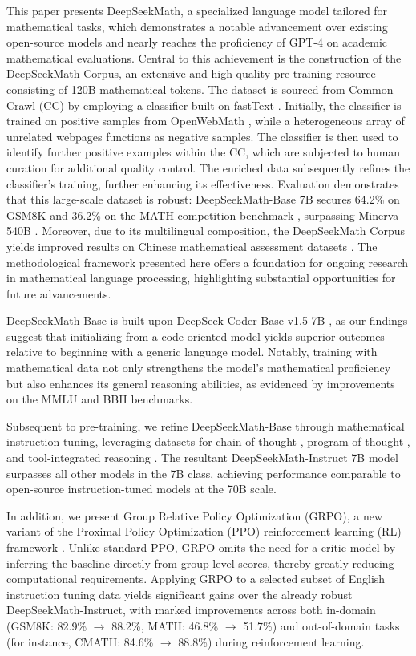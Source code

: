 This paper presents DeepSeekMath, a specialized language model tailored for mathematical tasks, which demonstrates a notable advancement over existing open-source models and nearly reaches the proficiency of GPT-4 on academic mathematical evaluations. Central to this achievement is the construction of the DeepSeekMath Corpus, an extensive and high-quality pre-training resource consisting of 120B mathematical tokens. The dataset is sourced from Common Crawl (CC) by employing a classifier built on fastText \citep{joulin2016fasttext}. Initially, the classifier is trained on positive samples from OpenWebMath \citep{openwebmath}, while a heterogeneous array of unrelated webpages functions as negative samples. The classifier is then used to identify further positive examples within the CC, which are subjected to human curation for additional quality control. The enriched data subsequently refines the classifier’s training, further enhancing its effectiveness. Evaluation demonstrates that this large-scale dataset is robust: DeepSeekMath-Base 7B secures 64.2\% on GSM8K \citep{gsm8k} and 36.2\% on the MATH competition benchmark \citep{MATH}, surpassing Minerva 540B \citep{minerva}. Moreover, due to its multilingual composition, the DeepSeekMath Corpus yields improved results on Chinese mathematical assessment datasets \citep{wei2023cmath,agieval}. The methodological framework presented here offers a foundation for ongoing research in mathematical language processing, highlighting substantial opportunities for future advancements.

DeepSeekMath-Base is built upon DeepSeek-Coder-Base-v1.5 7B \citep{deepseek-coder}, as our findings suggest that initializing from a code-oriented model yields superior outcomes relative to beginning with a generic language model. Notably, training with mathematical data not only strengthens the model’s mathematical proficiency but also enhances its general reasoning abilities, as evidenced by improvements on the MMLU \citep{mmlu} and BBH \citep{bbh} benchmarks.

Subsequent to pre-training, we refine DeepSeekMath-Base through mathematical instruction tuning, leveraging datasets for chain-of-thought \citep{cot}, program-of-thought \citep{pot,pal}, and tool-integrated reasoning \citep{tora}. The resultant DeepSeekMath-Instruct 7B model surpasses all other models in the 7B class, achieving performance comparable to open-source instruction-tuned models at the 70B scale.

In addition, we present Group Relative Policy Optimization (GRPO), a new variant of the Proximal Policy Optimization (PPO) reinforcement learning (RL) framework \citep{schulman2017proximal}. Unlike standard PPO, GRPO omits the need for a critic model by inferring the baseline directly from group-level scores, thereby greatly reducing computational requirements. Applying GRPO to a selected subset of English instruction tuning data yields significant gains over the already robust DeepSeekMath-Instruct, with marked improvements across both in-domain (GSM8K: 82.9\% $\rightarrow$ 88.2\%, MATH: 46.8\% $\rightarrow$ 51.7\%) and out-of-domain tasks (for instance, CMATH: 84.6\% $\rightarrow$ 88.8\%) during reinforcement learning.

